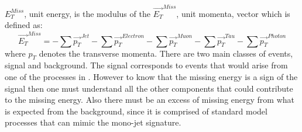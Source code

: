 $E_T^{Miss}$, unit energy, is the modulus of the $\vec{E_T}^{Miss}$, unit momenta, vector which is defined as:
\begin{equation}\label{eq:etmiss}
\vec{E_T}^{Miss} = - \sum \vec{p_T}^{Jet} - \sum \vec{p_T}^{Electron} - \sum \vec{p_T}^{Muon} - \sum \vec{p_T}^{Tau} - \sum \vec{p_T}^{Photon}
\end{equation}  
where $p_T$ denotes the transverse momenta.
There are two main classes of events, signal and background. 
The signal corresponds to events that would arise from one of the processes in . However to know that the missing energy is a sign of the signal then one must understand all the other components that could contribute to the missing energy. Also there must be an excess of missing energy from what is expected from the background, since it is comprised of standard model processes that can mimic the mono-jet signature.
